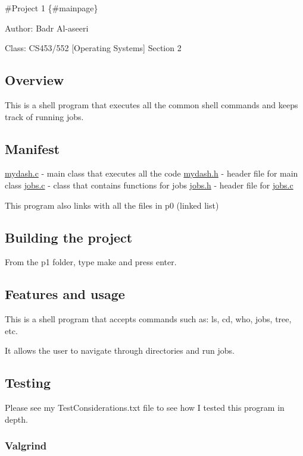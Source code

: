 \#\+Project 1 \{\#mainpage\}


\begin{DoxyItemize}
\item Author\+: Badr Al-\/aseeri
\item Class\+: C\+S453/552 \mbox{[}Operating Systems\mbox{]} Section 2
\end{DoxyItemize}

\subsection*{Overview}

This is a shell program that executes all the common shell commands and keeps track of running jobs.

\subsection*{Manifest}

\hyperlink{mydash_8c}{mydash.\+c} -\/ main class that executes all the code \hyperlink{mydash_8h}{mydash.\+h} -\/ header file for main class \hyperlink{jobs_8c}{jobs.\+c} -\/ class that contains functions for jobs \hyperlink{jobs_8h}{jobs.\+h} -\/ header file for \hyperlink{jobs_8c}{jobs.\+c}

This program also links with all the files in p0 (linked list)

\subsection*{Building the project}

From the p1 folder, type make and press enter.

\subsection*{Features and usage}

This is a shell program that accepts commands such as\+: ls, cd, who, jobs, tree, etc.

It allows the user to navigate through directories and run jobs.

\subsection*{Testing}

Please see my Test\+Considerations.\+txt file to see how I tested this program in depth.

\subsubsection*{Valgrind}

